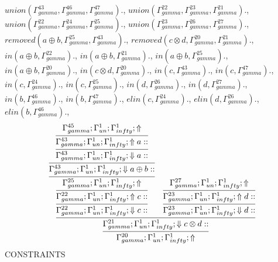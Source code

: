 \documentclass[a4paper, 11pt]{article}
\begin{document}
$union(\Gamma_{gamma}^{43}, \Gamma_{gamma}^{46}, \Gamma_{gamma}^{47}).$, $union(\Gamma_{gamma}^{22}, \Gamma_{gamma}^{23}, \Gamma_{gamma}^{21}).$, $union(\Gamma_{gamma}^{22}, \Gamma_{gamma}^{24}, \Gamma_{gamma}^{25}).$, $union(\Gamma_{gamma}^{23}, \Gamma_{gamma}^{26}, \Gamma_{gamma}^{27}).$, $removed(a \oplus b, \Gamma_{gamma}^{25}, \Gamma_{gamma}^{43}).$, $removed(c \otimes d, \Gamma_{gamma}^{20}, \Gamma_{gamma}^{21}).$, $in(a \oplus b, \Gamma_{gamma}^{22}).$, $in(a \oplus b, \Gamma_{gamma}^{21}).$, $in(a \oplus b, \Gamma_{gamma}^{25}).$, $in(a \oplus b, \Gamma_{gamma}^{20}).$, $in(c \otimes d, \Gamma_{gamma}^{20}).$, $in(c, \Gamma_{gamma}^{43}).$, $in(c, \Gamma_{gamma}^{47}).$, $in(c, \Gamma_{gamma}^{24}).$, $in(c, \Gamma_{gamma}^{25}).$, $in(d, \Gamma_{gamma}^{26}).$, $in(d, \Gamma_{gamma}^{27}).$, $in(b, \Gamma_{gamma}^{46}).$, $in(b, \Gamma_{gamma}^{47}).$, $elin(c, \Gamma_{gamma}^{24}).$, $elin(d, \Gamma_{gamma}^{26}).$, $elin(b, \Gamma_{gamma}^{46}).$, 
{\small
\[
\infer{\Gamma_{ gamma}^{20} ; \Gamma_{un}^{1} ; \Gamma_{ infty}^{1} ;  \Uparrow }
{\infer{\Gamma_{ gamma}^{21} ; \Gamma_{un}^{1} ; \Gamma_{ infty}^{1} ;  \Downarrow c \otimes d :: }
{\infer{\Gamma_{ gamma}^{22} ; \Gamma_{un}^{1} ; \Gamma_{ infty}^{1} ;  \Downarrow c :: }
{\infer{\Gamma_{ gamma}^{22} ; \Gamma_{un}^{1} ; \Gamma_{ infty}^{1} ;  \Uparrow c :: }
{\infer{\Gamma_{ gamma}^{25} ; \Gamma_{un}^{1} ; \Gamma_{ infty}^{1} ;  \Uparrow }
{\infer{\Gamma_{ gamma}^{43} ; \Gamma_{un}^{1} ; \Gamma_{ infty}^{1} ;  \Downarrow a \oplus b :: }
{\infer{\Gamma_{ gamma}^{43} ; \Gamma_{un}^{1} ; \Gamma_{ infty}^{1} ;  \Downarrow a :: }
{\infer{\Gamma_{ gamma}^{43} ; \Gamma_{un}^{1} ; \Gamma_{ infty}^{1} ;  \Uparrow a :: }
{\Gamma_{ gamma}^{45} ; \Gamma_{un}^{1} ; \Gamma_{ infty}^{1} ;  \Uparrow }}}}}}
&
\infer{\Gamma_{ gamma}^{23} ; \Gamma_{un}^{1} ; \Gamma_{ infty}^{1} ;  \Downarrow d :: }
{\infer{\Gamma_{ gamma}^{23} ; \Gamma_{un}^{1} ; \Gamma_{ infty}^{1} ;  \Uparrow d :: }
{\Gamma_{ gamma}^{27} ; \Gamma_{un}^{1} ; \Gamma_{ infty}^{1} ;  \Uparrow }}}}
\]
}
CONSTRAINTS
\end{document}
